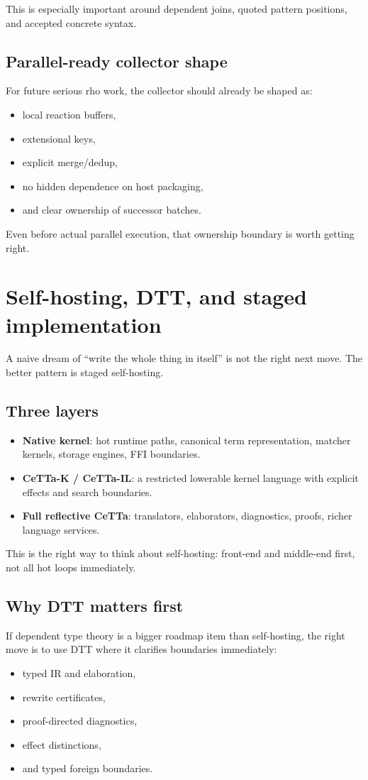 \documentclass[11pt]{article}
\begin{document}
This is especially important around dependent joins, quoted pattern positions, and accepted concrete syntax.

\subsection{Parallel-ready collector shape}
For future serious rho work, the collector should already be shaped as:
\begin{itemize}
  \item local reaction buffers,
  \item extensional keys,
  \item explicit merge/dedup,
  \item no hidden dependence on host packaging,
  \item and clear ownership of successor batches.
\end{itemize}

Even before actual parallel execution, that ownership boundary is worth getting right.

\section{Self-hosting, DTT, and staged implementation}
A naive dream of ``write the whole thing in itself'' is not the right next move. The better pattern is staged self-hosting.

\subsection{Three layers}
\begin{itemize}
  \item \textbf{Native kernel}: hot runtime paths, canonical term representation, matcher kernels, storage engines, FFI boundaries.
  \item \textbf{CeTTa-K / CeTTa-IL}: a restricted lowerable kernel language with explicit effects and search boundaries.
  \item \textbf{Full reflective CeTTa}: translators, elaborators, diagnostics, proofs, richer language services.
\end{itemize}

This is the right way to think about self-hosting: front-end and middle-end first, not all hot loops immediately.

\subsection{Why DTT matters first}
If dependent type theory is a bigger roadmap item than self-hosting, the right move is to use DTT where it clarifies boundaries immediately:
\begin{itemize}
  \item typed IR and elaboration,
  \item rewrite certificates,
  \item proof-directed diagnostics,
  \item effect distinctions,
  \item and typed foreign boundaries.
\end{itemize}
\end{document}
